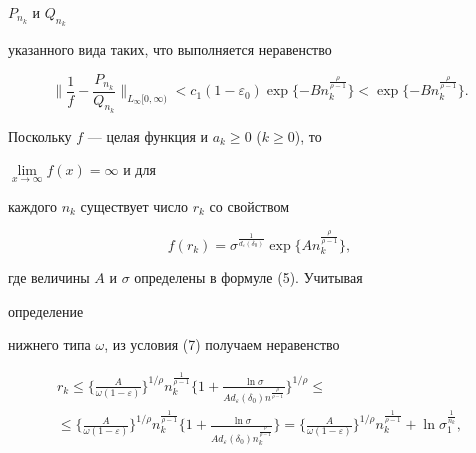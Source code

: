 $P_{n_k}$ и $Q_{n_k}$ 


указанного вида таких, что выполняется неравенство 


\begin{equation} 


\bigg\|\frac{1}{f}-\frac{P_{n_k}}{Q_{n_k}}\bigg\|_{L_\infty[0,\infty)} 


<c_1(1-\varepsilon_0)\exp\{-B n_k^{\frac{\rho}{\rho-1}}\}< 


\exp\{-B n_k^{\frac{\rho}{\rho-1}}\}. 


\end{equation} 


Поскольку $f$ --- целая функция и $a_k\ge 0$ ($k\ge0$), то 


$\lim\limits_{x\to\infty}f(x)=\infty$ и для  


каждого $n_k$ существует число $r_k$ со свойством 


\begin{equation} 


f(r_k)=\sigma^{\frac{1}{d_\varepsilon(\delta_0)}}\exp 


\{A n_k^{\frac{\rho}{\rho-1}}\}, 


\end{equation} 


где величины $A$ и $\sigma$ определены в формуле (5). Учитывая 


определение 


нижнего типа $\omega$, из условия (7) получаем неравенство 


\begin{multline} 


r_k\le\bigg\{\frac{A}{\omega(1-\varepsilon)}\bigg\} 


^{1/\rho}n_k^{\frac{1}{\rho-1}}\bigg\{1+ 


\frac{\ln\sigma}{A d_\varepsilon(\delta_0) 


n^{\frac{\rho}{\rho-1}}}\bigg\}^{1/\rho}\le \\ 


% 


\le\bigg\{\frac{A}{\omega(1-\varepsilon)}\bigg\}^{1/\rho} 


n_k^{\frac{1}{\rho-1}}\bigg\{ 


1+\frac{\ln\sigma}{A d_\varepsilon(\delta_0) 


n_k^{\frac{\rho}{\rho-1}}}\bigg\}=\bigg\{ 


\frac{A}{\omega(1-\varepsilon)}\bigg\}^{1/\rho} 


n_k^{\frac{1}{\rho-1}}+\ln\sigma_1^{\frac{1}{n_k}}, 


\end{multline} 


